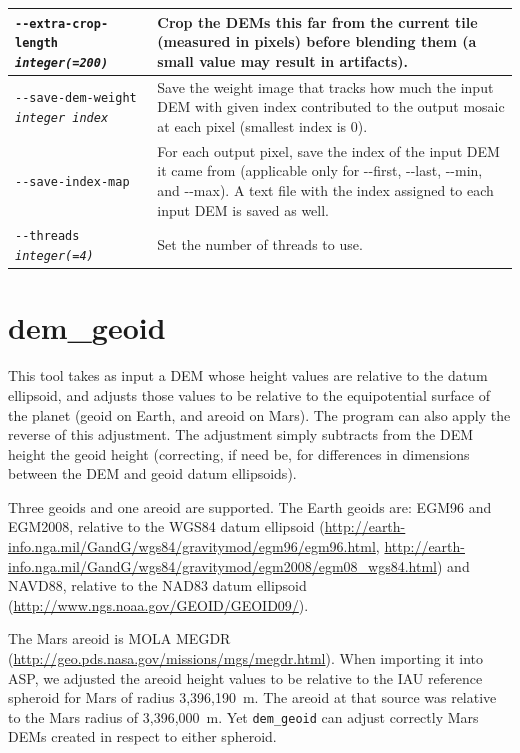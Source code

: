 \begin{longtable}{|l|p{10cm}|}
\texttt{-\/-extra-crop-length \textit{integer(=200)}} &
Crop the DEMs this far from the current tile (measured in pixels) before blending them (a small value may result in artifacts).
\\ \hline

\texttt{-\/-save-dem-weight \textit{integer index}} &
Save the weight image that tracks how much the input DEM with given index contributed to the output mosaic at each pixel (smallest index is 0).\\ \hline

\texttt{-\/-save-index-map} &
For each output pixel, save the index of the input DEM it came from
(applicable only for -\/-first, -\/-last, -\/-min, and -\/-max). A text
file with the index assigned to each input DEM is saved as well.\\ \hline

\texttt{-\/-threads \textit{integer(=4)}}
& Set the number of threads to use. \\ \hline
\end{longtable}

\clearpage

\section{dem\_geoid}
\label{demgeoid}

This tool takes as input a \ac{DEM} whose height values are relative to the
datum ellipsoid, and adjusts those values to be relative to the
equipotential surface of the planet (geoid on Earth, and areoid on
Mars). The program can also apply the reverse of this adjustment. The
adjustment simply subtracts from the DEM height the geoid height
(correcting, if need be, for differences in dimensions between the DEM
and geoid datum ellipsoids).

Three geoids and one areoid are supported. The Earth geoids are: EGM96
and EGM2008, relative to the WGS84 datum ellipsoid
(\url{http://earth-info.nga.mil/GandG/wgs84/gravitymod/egm96/egm96.html},
\url{http://earth-info.nga.mil/GandG/wgs84/gravitymod/egm2008/egm08_wgs84.html})
and NAVD88, relative to the NAD83 datum ellipsoid
(\url{http://www.ngs.noaa.gov/GEOID/GEOID09/}).

The Mars areoid is MOLA MEGDR
(\url{http://geo.pds.nasa.gov/missions/mgs/megdr.html}). When importing
it into ASP, we adjusted the areoid height values to be relative to
the IAU reference spheroid for Mars of radius 3,396,190~m. The areoid at that source was
relative to the Mars radius of 3,396,000~m. Yet \texttt{dem\_geoid} can adjust
correctly Mars DEMs created in respect to either spheroid.

